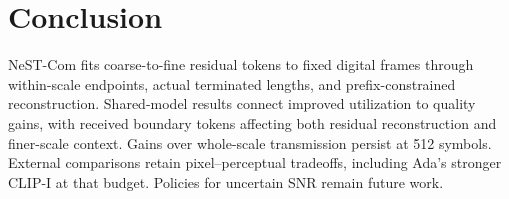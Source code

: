 \section{Conclusion}
NeST-Com fits coarse-to-fine residual tokens to fixed digital frames through within-scale endpoints, actual terminated lengths, and prefix-constrained reconstruction. Shared-model results connect improved utilization to quality gains, with received boundary tokens affecting both residual reconstruction and finer-scale context. Gains over whole-scale transmission persist at 512 symbols. External comparisons retain pixel--perceptual tradeoffs, including Ada's stronger CLIP-I at that budget. Policies for uncertain SNR remain future work.
